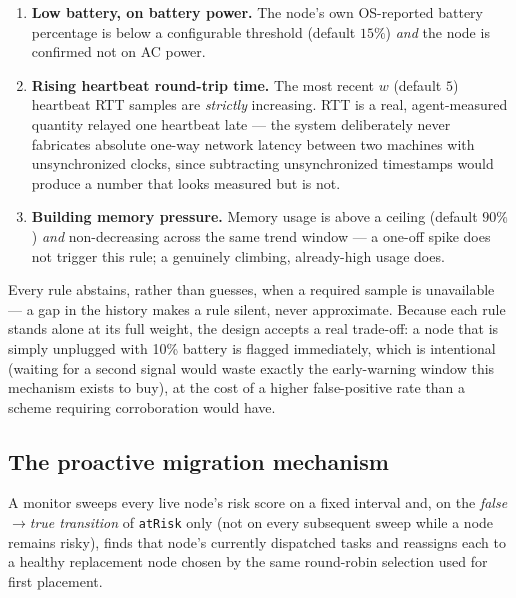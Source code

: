 \documentclass[conference]{IEEEtran}
\begin{document}
\begin{enumerate}
\item \textbf{Low battery, on battery power.} The node's own OS-reported battery percentage is below
  a configurable threshold (default $15\%$) \emph{and} the node is confirmed not on AC power.
\item \textbf{Rising heartbeat round-trip time.} The most recent $w$ (default $5$) heartbeat RTT
  samples are \emph{strictly} increasing. RTT is a real, agent-measured quantity relayed one heartbeat
  late — the system deliberately never fabricates absolute one-way network latency between two
  machines with unsynchronized clocks, since subtracting unsynchronized timestamps would produce a
  number that looks measured but is not.
\item \textbf{Building memory pressure.} Memory usage is above a ceiling (default $90\%$) \emph{and}
  non-decreasing across the same trend window — a one-off spike does not trigger this rule; a
  genuinely climbing, already-high usage does.
\end{enumerate}

Every rule abstains, rather than guesses, when a required sample is unavailable — a gap in the
history makes a rule silent, never approximate. Because each rule stands alone at its full weight,
the design accepts a real trade-off: a node that is simply unplugged with 10\% battery is flagged
immediately, which is intentional (waiting for a second signal would waste exactly the early-warning
window this mechanism exists to buy), at the cost of a higher false-positive rate than a scheme
requiring corroboration would have.

\subsection{The proactive migration mechanism}

A monitor sweeps every live node's risk score on a fixed interval and, on the \emph{false$\to$true
transition} of \texttt{atRisk} only (not on every subsequent sweep while a node remains risky), finds
that node's currently dispatched tasks and reassigns each to a healthy replacement node chosen by the
same round-robin selection used for first placement.
\end{document}

